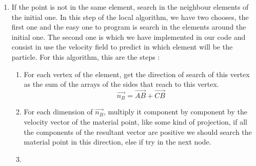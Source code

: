 \begin{enumerate}
  \item If the point is not in the same element, search in the
    neighbour elements of the initial one. In this step of the local
    algorithm, we have two chooses, the first one and the easy one to
    program is search in the elements around the initial one. The
    second one is which we have implemented in our code and consist in
    use the velocity field to predict in which element will be the
    particle. For this algorithm, this are the steps :
    \begin{enumerate}
    \item For each vertex of the element, get the direction of search
      of this vertex as the sum of the arrays of the sides that reach
      to this vertex.
      \begin{equation}
        \label{eq:VertexSeachDirection}
        \overrightarrow{n_B} = \overrightarrow{AB} + \overrightarrow{CB}
      \end{equation}
    \item For each dimension of $\overrightarrow{n_B}$, multiply it
      component by component by the velocity vector of the material
      point, like some kind of projection, if all the components of
      the resultant vector are positive we should search the material
      point in this direction, else if try in the next node.

    \item 
    \end{enumerate}

  
  
\end{enumerate}




